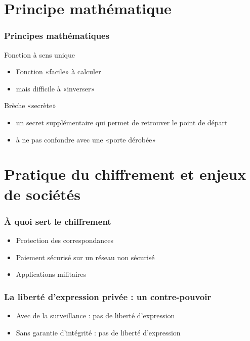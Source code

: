 \documentclass[french]{beamer}
\begin{document}
\section{Principe mathématique}
\begin{frame}
  \frametitle{Principes mathématiques}
  \begin{multicols}{2}
    \begin{block}{Fonction à sens unique}
      \begin{itemize}
        \item Fonction «facile» à calculer
        \item mais difficile à «inverser»
      \end{itemize}
    \end{block}
    \columnbreak
    \begin{block}{Brèche «secrète»}
      \begin{itemize}
        \item un secret supplémentaire qui permet de retrouver le point
          de départ
        \item à ne pas confondre avec une «porte dérobée»
      \end{itemize}
    \end{block}
  \end{multicols}
\end{frame}

\section{Pratique du chiffrement et enjeux de sociétés}

\begin{frame}
  \frametitle{À quoi sert le chiffrement}
  \begin{itemize}
    \item Protection des correspondances
    \item Paiement sécurisé sur un réseau non sécurisé
    \item Applications militaires
  \end{itemize}
\end{frame}

\begin{frame}
  \frametitle{La liberté d'expression privée : un contre-pouvoir}
  \begin{itemize}
    \item Avec de la surveillance : pas de liberté d'expression
    \item Sans garantie d'intégrité : pas de liberté d'expression
  \end{itemize}
\end{frame}
\end{document}
